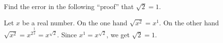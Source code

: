 Find the error in the following ``proof'' that $\sqrt2=1$.

Let $x$ be a real number. On the one hand $\sqrt{x^2}=x^1$. On the other hand $\sqrt{x^2}=x^{2^{\dfrac{1}{2}}}=x^{\sqrt2}$. Since $x^1=x^{\sqrt2}$, we get $\sqrt2=1$.
